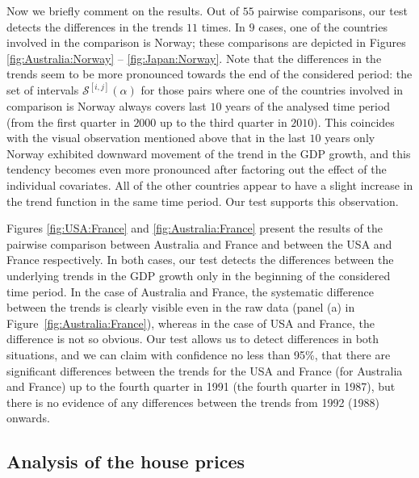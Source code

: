 \documentclass[a4paper,12pt]{article}
\begin{document}
Now we briefly comment on the results. Out of $55$ pairwise comparisons, our test detects the differences in the trends $11$ times. In $9$ cases, one of the countries involved in the comparison is Norway; these comparisons are depicted in Figures \ref{fig:Australia:Norway} -- \ref{fig:Japan:Norway}. Note that the differences in the trends seem to be more pronounced towards the end of the considered period: the set of intervals $\mathcal{S}^{[i, j]}(\alpha)$ for those pairs where one of the countries involved in comparison is Norway always covers last $10$ years of the analysed time period (from the first quarter in $2000$ up to the third quarter in $2010$). This coincides with the visual observation mentioned above that in the last $10$ years only Norway exhibited downward movement of the trend in the GDP growth, and this tendency becomes even more pronounced after factoring out the effect of the individual covariates. All of the other countries appear to have a slight increase in the trend function in the same time period. Our test supports this observation.

Figures \ref{fig:USA:France} and \ref{fig:Australia:France} present the results of the pairwise comparison between Australia and France and between the USA and France respectively. In both cases, our test detects the differences between the underlying trends in the GDP growth only in the beginning of the considered time period. In the case of Australia and France, the systematic difference between the trends is clearly visible even in the raw data (panel (a) in Figure~\ref{fig:Australia:France}), whereas in the case of USA and France, the difference is not so obvious. Our test allows us to detect differences in both situations, and we can claim with confidence no less than 95\%, that there are significant differences between the trends for the USA and France (for Australia and France) up to the fourth quarter in 1991 (the fourth quarter in 1987), but there is no evidence of any differences between the trends from 1992 (1988) onwards.



\subsection{Analysis of the house prices}\label{subsec:app:hp}
\end{document}
